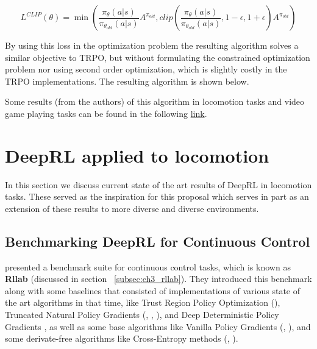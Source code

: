 \begin{equation}
    L^{CLIP}(\theta) = \min \left ( \frac{\pi_{\theta}(a|s)}{\pi_{\theta_{old}}(a|s)} A^{\pi_{old}},
                                clip \left ( 
                                \frac{\pi_{\theta}(a|s)}{\pi_{\theta_{old}}(a|s)},
                                1-\epsilon, 1+\epsilon
                                     \right ) A^{\pi_{old}} \right )
\end{equation}

By using this loss in the optimization problem the resulting algorithm solves a similar
objective to TRPO, but without formulating the constrained optimization problem nor
using second order optimization, which is slightly costly in the TRPO implementations.
The resulting algorithm is shown below.

\algPPO

Some results (from the authors) of this algorithm in locomotion tasks and video game playing tasks 
can be found in the following \href{https://blog.openai.com/openai-baselines-ppo/}{link}.

\newpage

\section{DeepRL applied to locomotion}

In this section we discuss current state of the art results of DeepRL in locomotion 
tasks. These served as the inspiration for this proposal which serves in part as an 
extension of these results to more diverse and diverse environments.

\subsection{Benchmarking DeepRL for Continuous Control}

\cite{Rllab} presented a benchmark suite for continuous control tasks, which is
known as \textbf{Rllab} (discussed in section ~\ref{subsec:ch3_rllab}). They 
introduced this benchmark along with some baselines that consisted of implementations of 
various state of the art algorithms in that time, like Trust Region Policy Optimization 
(\citeauthor{TRPO}), Truncated Natural Policy Gradients (\citeauthor{NaturalPolicyGradient}, 
\citeauthor{TNPG1}, \citeauthor{TNPG2}), and Deep Deterministic Policy Gradients \citep{DDPG}, 
as well as some base algorithms like Vanilla Policy Gradients (\citeauthor{REINFORCE}, 
\citeauthor{PGSutton}), and some derivate-free algorithms like Cross-Entropy methods 
(\citeauthor{CrossEntropyMethods}, \citeauthor{CrossEntropyTetris}).

